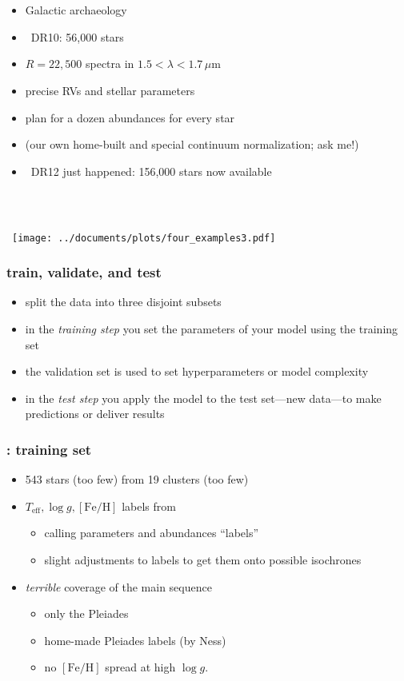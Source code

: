 \documentclass[pdftex]{beamer}
\newcommand{\teff}{T_{\mathrm{eff}}}
\newcommand{\logg}{\log g}
\newcommand{\feh}{[\mathrm{Fe / H}]}
\begin{document}
\begin{frame}
  \frametitle{\sdssiii\ \apogee}
  \begin{itemize}
  \item Galactic archaeology
  \item \apogee\ DR10: 56,000 stars
  \item $R=22,500$ spectra in $1.5<\lambda<1.7\,\mu\mathrm{m}$
  \item precise RVs and stellar parameters
  \item plan for a dozen abundances for every star
  \item (our own home-built and special continuum normalization; ask me!)
  \item \apogee\ DR12 just happened: 156,000 stars now available
  \end{itemize}
\end{frame}

\begin{frame}
  \frametitle{\sdssiii\ \apogee}
  ~\hfill\texttt{[image: ../documents/plots/four\_examples3.pdf]}
\end{frame}

\begin{frame}
  \frametitle{train, validate, and test}
  \begin{itemize}
  \item split the data into three disjoint subsets
  \item in the \emph{training step} you set the parameters of your model using the training set
  \item the validation set is used to set hyperparameters or model complexity
  \item in the \emph{test step} you apply the model to the test set---new data---to make predictions or deliver results
  \end{itemize}
\end{frame}

\begin{frame}
  \frametitle{\tc: training set}
  \begin{itemize}
  \item 543 stars (too few) from 19 clusters (too few)
  \item $\teff, \logg, \feh$ labels from \apogee
    \begin{itemize}
    \item calling parameters and abundances ``labels''
    \item slight adjustments to labels to get them onto possible isochrones
    \end{itemize}
  \item \emph{terrible} coverage of the main sequence
    \begin{itemize}
    \item only the Pleiades
    \item home-made Pleiades labels (by Ness)
    \item no $\feh$ spread at high $\logg$.
    \end{itemize}
  \end{itemize}
\end{frame}
\end{document}
